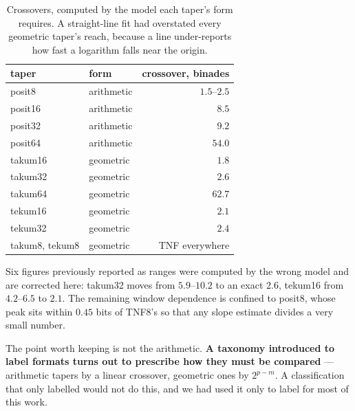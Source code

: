 \documentclass[11pt]{article}
\theoremstyle{definition}
\begin{document}
\begin{table}[t]\centering
\caption{Crossovers, computed by the model each taper's form requires. A
straight-line fit had overstated every geometric taper's reach, because a line
under-reports how fast a logarithm falls near the origin.}
\label{tab:crosscorrected}
\begin{tabular}{llr}
\toprule
taper & form & crossover, binades \\
\midrule
posit8 & arithmetic & $1.5$--$2.5$ \\
posit16 & arithmetic & $8.5$ \\
posit32 & arithmetic & $9.2$ \\
posit64 & arithmetic & $54.0$ \\
takum16 & geometric & $\mathbf{1.8}$ \\
takum32 & geometric & $\mathbf{2.6}$ \\
takum64 & geometric & $\mathbf{62.7}$ \\
tekum16 & geometric & $\mathbf{2.1}$ \\
tekum32 & geometric & $\mathbf{2.4}$ \\
takum8, tekum8 & geometric & TNF everywhere \\
\bottomrule
\end{tabular}
\end{table}

Six figures previously reported as ranges were computed by the wrong model and
are corrected here: takum32 moves from $5.9$--$10.2$ to an exact $2.6$, tekum16
from $4.2$--$6.5$ to $2.1$. The remaining window dependence is confined to
posit8, whose peak sits within $0.45$ bits of TNF8's so that any slope estimate
divides a very small number.

The point worth keeping is not the arithmetic. \textbf{A taxonomy introduced to label
formats turns out to prescribe how they must be compared} --- arithmetic tapers
by a linear crossover, geometric ones by $2^{p-m}$. A classification that only
labelled would not do this, and we had used it only to label for most of this
work.
\end{document}
